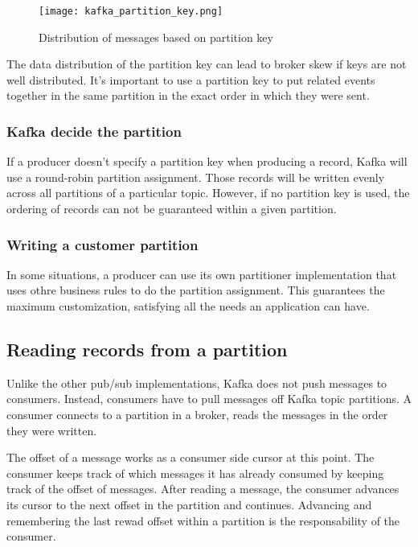 \begin{figure}[ht]
    \centering
    \texttt{[image: kafka\_partition\_key.png]}
    \caption{Distribution of messages based on partition key}
\end{figure}

The data distribution of the partition key can lead to broker skew if keys are
not well distributed. It's important to use a partition key to put related
events together in the same partition in the exact order in which they were
sent.

\subsubsection{Kafka decide the partition}

If a producer doesn't specify a partition key when producing a record, Kafka
will use a round-robin partition assignment. Those records will be written
evenly across all partitions of a particular topic.
However, if no partition key is used, the ordering of records can not be
guaranteed within a given partition.

\subsubsection{Writing a customer partition}

In some situations, a producer can use its own partitioner implementation that
uses othre business rules to do the partition assignment.
This guarantees the maximum customization, satisfying all the needs an
application can have.

\subsection{Reading records from a partition}

Unlike the other pub/sub implementations, Kafka does not push messages to
consumers.
Instead, consumers have to pull messages off Kafka topic partitions. A consumer
connects to a partition in a broker, reads the messages in the order they were
written.

The offset of a message works as a consumer side cursor at this point.
The consumer keeps track of which messages it has already consumed by keeping
track of the offset of messages. After reading a message, the consumer advances
its cursor to the next offset in the partition and continues.
Advancing and remembering the last rewad offset within a partition is the
responsability of the consumer.

